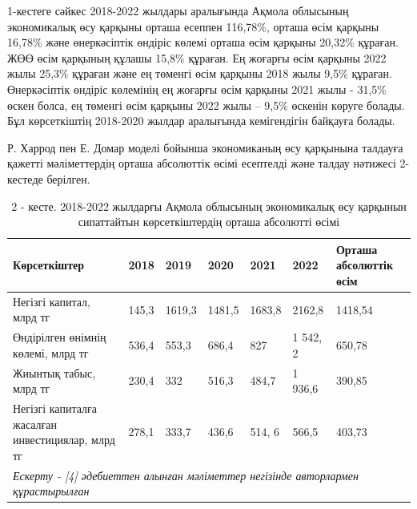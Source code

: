 \begin{multicols}{2}
1-кестеге сәйкес 2018-2022 жылдары аралығында Ақмола облысының
экономикалық өсу қарқыны орташа есеппен 116,78\%, орташа өсім қарқыны
16,78\% және өнеркәсіптік өндіріс көлемі орташа өсім қарқыны 20,32\%
құраған. ЖӨӨ өсім қарқының құлашы 15,8\% құраған. Ең жоғарғы өсім
қарқыны 2022 жылы 25,3\% құраған және ең төменгі өсім қарқыны 2018 жылы
9,5\% құраған. Өнеркәсіптік өндіріс көлемінің ең жоғарғы өсім қарқыны
2021 жылы - 31,5\% өскен болса, ең төменгі өсім қарқыны 2022 жылы --
9,5\% өскенін көруге болады. Бұл көрсеткіштің 2018-2020 жылдар
аралығында кемігендігін байқауға болады.

Р. Харрод пен Е. Домар моделі бойынша экономиканың өсу қарқынына
талдауға қажетті мәліметтердің орташа абсолюттік өсімі есептелді және
талдау нәтижесі 2-кестеде берілген.
\end{multicols}

\begin{table}[H]
\caption*{2 - кесте. 2018-2022 жылдарғы Ақмола облысының экономикалық өсу
қарқынын сипаттайтын көрсеткіштердің орташа абсолютті өсімі}
\centering
\begin{tabular}{|lllllll|}
\hline
\multicolumn{1}{|l|}{Көрсеткіштер} &
  \multicolumn{1}{l|}{2018} &
  \multicolumn{1}{l|}{2019} &
  \multicolumn{1}{l|}{2020} &
  \multicolumn{1}{l|}{2021} &
  \multicolumn{1}{l|}{2022} &
  Орташа абсолюттік өсім \\ \hline
\multicolumn{1}{|p{0.25\textwidth}|}{Негізгі капитал, млрд тг} &
  \multicolumn{1}{l|}{145,3} &
  \multicolumn{1}{l|}{1619,3} &
  \multicolumn{1}{l|}{1481,5} &
  \multicolumn{1}{l|}{1683,8} &
  \multicolumn{1}{l|}{2162,8} &
  1418,54 \\ \hline
\multicolumn{1}{|p{0.25\textwidth}|}{Өндірілген өнімнің көлемі, млрд тг} &
  \multicolumn{1}{l|}{536,4} &
  \multicolumn{1}{l|}{553,3} &
  \multicolumn{1}{l|}{686,4} &
  \multicolumn{1}{l|}{827} &
  \multicolumn{1}{l|}{1 542, 2} &
  650,78 \\ \hline
\multicolumn{1}{|p{0.25\textwidth}|}{Жиынтық табыс, млрд тг} &
  \multicolumn{1}{l|}{230,4} &
  \multicolumn{1}{l|}{332} &
  \multicolumn{1}{l|}{516,3} &
  \multicolumn{1}{l|}{484,7} &
  \multicolumn{1}{l|}{1 936,6} &
  390,85 \\ \hline
\multicolumn{1}{|p{0.25\textwidth}|}{Негізгі капиталға жасалған инвестициялар, млрд тг} &
  \multicolumn{1}{l|}{278,1} &
  \multicolumn{1}{l|}{333,7} &
  \multicolumn{1}{l|}{436,6} &
  \multicolumn{1}{l|}{514, 6} &
  \multicolumn{1}{l|}{566,5} &
  403,73 \\ \hline
\multicolumn{7}{|l|}{\textit{Ескерту - {[}4{]} әдебиеттен алынған мәліметтер негізінде авторлармен құрастырылған}} \\ \hline
\end{tabular}
\end{table}

